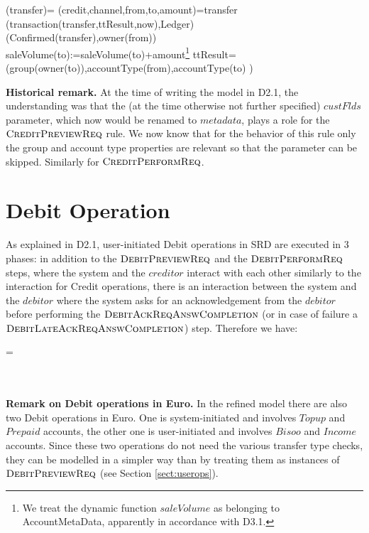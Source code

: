 \begin{asm}
(transfer)=\+  
\LET (credit,channel,from,to,amount)=transfer \\ 
   (transaction(transfer,ttResult,now),Ledger)\\
   (Confirmed(transfer),\TO owner(from))\\
   saleVolume(to):=saleVolume(to)+amount\footnote{We treat the dynamic function $saleVolume$ as belonging to AccountMetaData, apparently in accordance with D3.1.} \-
\WHERE \+
 ttResult= (group(owner(to)),accountType(from),accountType(to) )
\end{asm}



{\bf Historical remark.} At the time of writing the model in D2.1, the understanding was that the (at the time otherwise not further specified) $custFlds$ parameter, which now would be renamed to $metadata$, plays a role for the $\hbox{\sc CreditPreviewReq}$ rule. We now know that for the behavior of this rule only the group and account type properties are relevant so that the parameter can be skipped. Similarly for $\hbox{\sc CreditPerformReq}$.




\section{Debit Operation} 
\label{sect:debitops}

As explained in D2.1, user-initiated Debit operations in SRD are executed in 3 phases: in addition to the $\hbox{\sc DebitPreviewReq}$ and the $\hbox{\sc DebitPerformReq}$ steps, where the system and the $creditor$ interact with each other similarly to the interaction for Credit operations, there is an interaction between the system and the $debitor$ where the system asks for an acknowledgement from the $debitor$ before performing the $\hbox{\sc DebitAckReqAnswCompletion}$ (or in case of failure a $\hbox{\sc DebitLateAckReqAnswCompletion}$) step. Therefore we have:

\begin{asm}
=\+
    \\
    \\
   \\
\end{asm}

{\bf Remark on Debit operations in Euro.} In the refined model there are also two Debit operations in Euro. One is system-initiated and involves $Topup$ and $Prepaid$ accounts, the other one is user-initiated  and involves $Bisoo$ and $Income$ accounts. Since these two operations do not need the various transfer type checks, they can be modelled in a simpler way than by treating them as instances of $\hbox{\sc DebitPreviewReq}$ (see Section \ref{sect:userops}).

